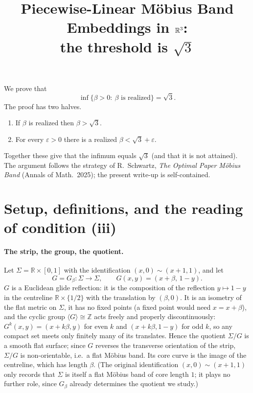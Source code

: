 \documentclass[12pt]{article}
\title{Piecewise-Linear M\"obius Band Embeddings in $\R^3$:\\
the threshold is $\sqrt3$}
\author{}
\date{}
\newcommand{\R}{\mathbb{R}}
\newcommand{\Z}{\mathbb{Z}}
\newcommand{\eps}{\varepsilon}
\newcommand{\Sig}{\Sigma}
\begin{document}
\maketitle

\noindent
We prove that
\[
\inf\{\beta>0:\ \beta\text{ is realized}\}=\sqrt3 .
\]
The proof has two halves.
\begin{enumerate}
\item[\textbf{(S1)}] If $\beta$ is realized then $\beta>\sqrt3$.
\item[\textbf{(S2)}] For every $\eps>0$ there is a realized $\beta<\sqrt3+\eps$.
\end{enumerate}
Together these give that the infimum equals $\sqrt3$ (and that it is not
attained). The argument follows the strategy of R.~Schwartz, \emph{The
Optimal Paper M\"obius Band} (Annals of Math.\ 2025); the present write-up
is self-contained.

\section{Setup, definitions, and the reading of condition (iii)}
\label{sec:setup}

\paragraph{The strip, the group, the quotient.}
Let $\Sig=\R\times[0,1]$ with the identification
$(x,0)\sim(x+1,1)$, and let
\[
G=G_\beta:\Sig\to\Sig,\qquad G(x,y)=(x+\beta,\,1-y).
\]
$G$ is a Euclidean glide reflection: it is the composition of the
reflection $y\mapsto 1-y$ in the centreline $\R\times\{1/2\}$ with the
translation by $(\beta,0)$. It is an isometry of the flat metric on
$\Sig$, it has no fixed points (a fixed point would need $x=x+\beta$),
and the cyclic group $\langle G\rangle\cong\Z$ acts freely and properly
discontinuously: $G^k(x,y)=(x+k\beta,y)$ for even $k$ and
$(x+k\beta,1-y)$ for odd $k$, so any compact set meets only finitely
many of its translates. Hence the quotient $\Sig/G$ is a smooth flat
surface; since $G$ reverses the transverse orientation of the strip,
$\Sig/G$ is non-orientable, i.e.\ a flat M\"obius band. Its core curve is
the image of the centreline, which has length $\beta$. (The original
identification $(x,0)\sim(x+1,1)$ only records that $\Sig$ is itself a
flat M\"obius band of core length $1$; it plays no further role, since
$G_\beta$ already determines the quotient we study.)
\end{document}
